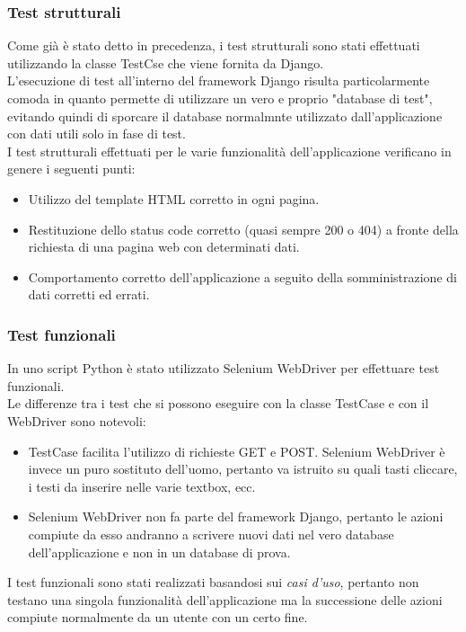 \documentclass[10pt,a4paper]{report}
\begin{document}
	\subsubsection{Test strutturali}
	Come già è stato detto in precedenza, i test strutturali sono stati effettuati utilizzando la classe TestCse che viene fornita da Django. \\
	L'esecuzione di test all'interno del framework Django risulta particolarmente comoda in quanto permette di utilizzare un vero e proprio "database di test", evitando quindi di sporcare il database normalmnte utilizzato dall'applicazione con dati utili solo in fase di test. \\
	I test strutturali effettuati per le varie funzionalità dell'applicazione verificano in genere i seguenti punti:
	\begin{itemize}
		\item Utilizzo del template HTML corretto in ogni pagina.
		\item Restituzione dello status code corretto (quasi sempre 200 o 404) a fronte della richiesta di una pagina web con determinati dati.
		\item Comportamento corretto dell'applicazione a seguito della somministrazione di dati corretti ed errati.
	\end{itemize}

	\subsubsection{Test funzionali}
	In uno script Python è stato utilizzato Selenium WebDriver per effettuare test funzionali. \\
	Le differenze tra i test che si possono eseguire con la classe TestCase e con il WebDriver sono notevoli:
	\begin{itemize}
		\item TestCase facilita l'utilizzo di richieste GET e POST. Selenium WebDriver è invece un puro sostituto dell'uomo, pertanto va istruito su quali tasti cliccare, i testi da inserire nelle varie textbox, ecc.
		\item Selenium WebDriver non fa parte del framework Django, pertanto le azioni compiute da esso andranno a scrivere nuovi dati nel vero database dell'applicazione e non in un database di prova.
	\end{itemize}
	I test funzionali sono stati realizzati basandosi sui \textit{casi d'uso}, pertanto non testano una singola funzionalità dell'applicazione ma la successione delle azioni compiute normalmente da un utente con un certo fine.
	
\end{document}
